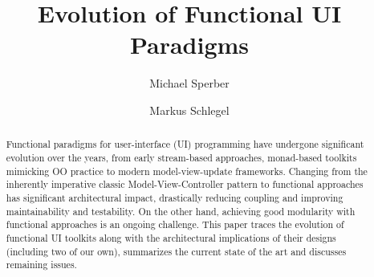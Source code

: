 \documentclass[sigplan,review,screen]{acmart}
\begin{document}
\title{Evolution of Functional UI Paradigms}

\author{Michael Sperber}

\author{Markus Schlegel}

\begin{abstract}
  Functional paradigms for user-interface (UI) programming have
  undergone significant evolution over the years, from early
  stream-based approaches, monad-based toolkits mimicking OO practice
  to modern model-view-update frameworks.  Changing from the
  inherently imperative classic Model-View-Controller pattern to
  functional approaches has significant architectural impact,
  drastically reducing coupling and improving maintainability and
  testability.  On the other hand, achieving good modularity with
  functional approaches is an ongoing challenge.  This paper traces
  the evolution of functional UI toolkits along with the architectural
  implications of their designs (including two of our own), summarizes
  the current state of the art and discusses remaining issues.
\end{abstract}
\end{document}
